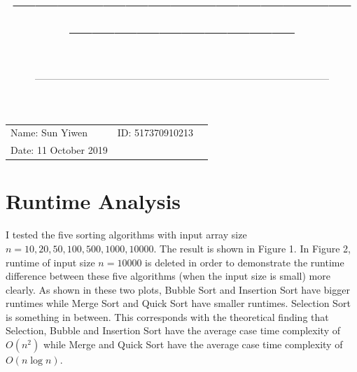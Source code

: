 \documentclass[a4paper]{article}
\title{—————————————————————————\\ \sc{UM-SJTU Joint Institute}}
\author{\sc{Data Structures and Algorithms}}
\date{\sc{(Ve281)}\\——————————————————————————————}
\begin{document}
\maketitle
\vspace{5cm}
\centerline{\Large{}}
\vspace{9cm}
\begin{tabular}{lll}
\qquad \qquad Name: Sun Yiwen&ID: 517370910213\\
\qquad \qquad Date: 11 October 2019
\end{tabular}

\newpage
\section{Runtime Analysis}
\noindent
\par
I tested the five sorting algorithms with input array size $n=10,20,50,100,500,1000,10000$. The result is shown in Figure 1. In Figure 2, runtime of input size $n=10000$ is deleted in order to demonstrate the runtime difference between these five algorithms (when the input size is small) more clearly. As shown in these two plots, Bubble Sort and Insertion Sort have bigger runtimes while Merge Sort and Quick Sort have smaller runtimes. Selection Sort is something in between. This corresponds with the theoretical finding that Selection, Bubble and Insertion Sort have the average case time complexity of $O(n^2)$ while Merge and Quick Sort have the average case time complexity of $O(n\log n)$.
\end{document}
